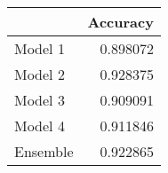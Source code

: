 \begin{tabular}{lr}
\toprule
{} &  Accuracy \\
\midrule
Model 1  &  0.898072 \\
Model 2  &  0.928375 \\
Model 3  &  0.909091 \\
Model 4  &  0.911846 \\
Ensemble &  0.922865 \\
\bottomrule
\end{tabular}
